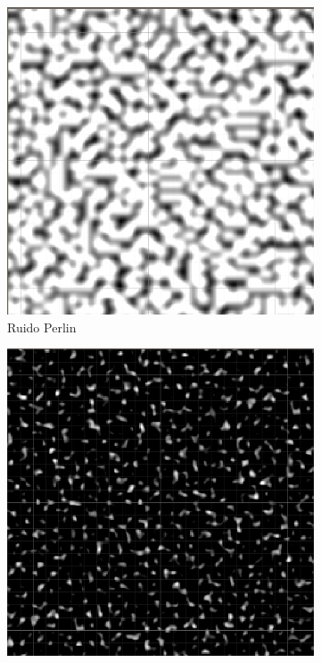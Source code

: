 \begin{figure}[ht]
    \begin{subfigure}{0.3\linewidth}
        \centering
        \includegraphics[width=\linewidth]{img/codes/MediumNoiseScale.png}
        \caption{Ruido Perlin}
    \end{subfigure}
    \hfill
    \begin{subfigure}{0.3\linewidth}
        \centering
        \includegraphics[width=\linewidth]{img/codes/Simplex.png}

\end{subfigure}
\end{figure}
